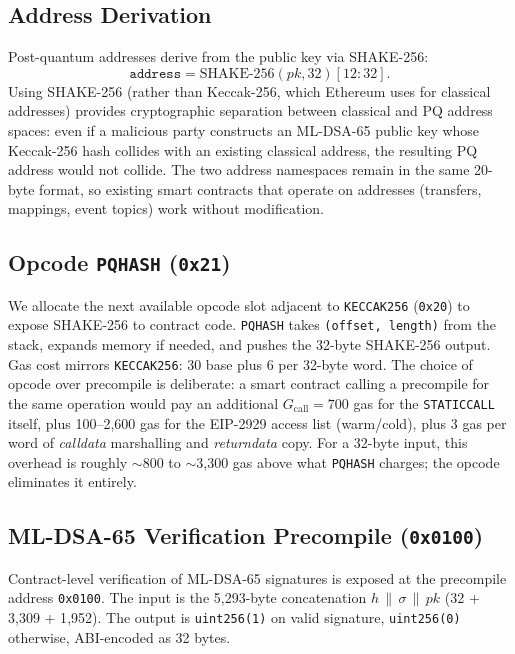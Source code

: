 \documentclass[journal,onecolumn,11pt]{IEEEtran}
\begin{document}
\subsection{Address Derivation}
\label{sec:design_addr}

Post-quantum addresses derive from the public key via SHAKE-256:
\begin{equation}
\texttt{address} = \mathrm{SHAKE\text{-}256}(\mathit{pk}, 32)[12{:}32].
\label{eq:address}
\end{equation}
Using SHAKE-256 (rather than Keccak-256, which Ethereum uses for classical addresses) provides cryptographic separation between classical and PQ address spaces: even if a malicious party constructs an ML-DSA-65 public key whose Keccak-256 hash collides with an existing classical address, the resulting PQ address would not collide. The two address namespaces remain in the same 20-byte format, so existing smart contracts that operate on addresses (transfers, mappings, event topics) work without modification.

\subsection{Opcode \texttt{PQHASH} (\texttt{0x21})}
\label{sec:design_pqhash}

We allocate the next available opcode slot adjacent to \texttt{KECCAK256} (\texttt{0x20}) to expose SHAKE-256 to contract code. \texttt{PQHASH} takes \texttt{(offset, length)} from the stack, expands memory if needed, and pushes the 32-byte SHAKE-256 output. Gas cost mirrors \texttt{KECCAK256}: 30 base plus 6 per 32-byte word. The choice of opcode over precompile is deliberate: a smart contract calling a precompile for the same operation would pay an additional $G_{\text{call}} = 700$ gas for the \texttt{STATICCALL} itself, plus 100--2{,}600 gas for the EIP-2929 access list (warm/cold), plus 3 gas per word of \emph{calldata} marshalling and \emph{returndata} copy. For a 32-byte input, this overhead is roughly $\sim$800 to $\sim$3{,}300 gas above what \texttt{PQHASH} charges; the opcode eliminates it entirely.

\subsection{ML-DSA-65 Verification Precompile (\texttt{0x0100})}
\label{sec:design_precompile}

Contract-level verification of ML-DSA-65 signatures is exposed at the precompile address \texttt{0x0100}. The input is the 5{,}293-byte concatenation $h \,\|\, \sigma \,\|\, \mathit{pk}$ (32 + 3{,}309 + 1{,}952). The output is \texttt{uint256(1)} on valid signature, \texttt{uint256(0)} otherwise, ABI-encoded as 32 bytes.
\end{document}
